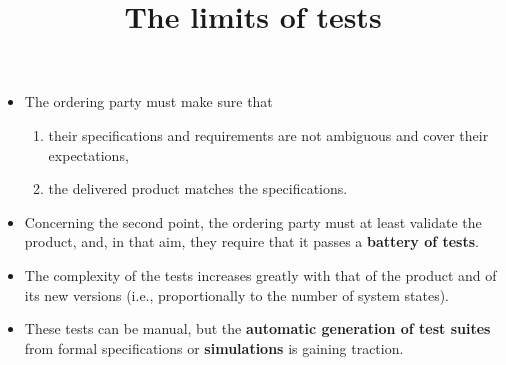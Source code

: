 \documentclass[wide]{slides}
\begin{document}
\begin{slide}
  \title{The limits of tests}

  \begin{itemize}

    \item  The ordering party must make sure that
      \begin{enumerate}

        \item their specifications and requirements are not ambiguous
          and cover their expectations,

        \item the delivered product matches the specifications.

      \end{enumerate}

    \item Concerning the second point, the ordering party must at
      least validate the product, and, in that aim, they require that
      it passes a \textbf{battery of tests}.

    \item The complexity of the tests increases greatly with that of
      the product and of its new versions (i.e., proportionally to the
      number of system states).

    \item These tests can be manual, but the \textbf{automatic
      generation of test suites} from formal specifications or
      \textbf{simulations} is gaining traction.

  \end{itemize}
\end{slide}
\end{document}
